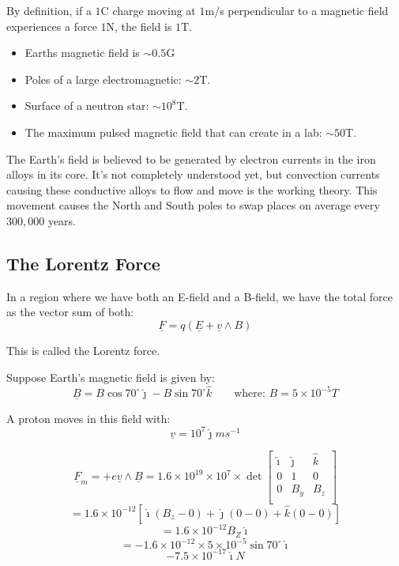 By definition, if a $1$C charge moving at $1$m/s perpendicular to a magnetic field experiences a force $1$N, the field is $1$T.

\begin{itemize}
    \item Earths magnetic field is $\sim 0.5$G
    \item Poles of a large electromagnetic: $\sim 2$T.
    \item Surface of a neutron star: $\sim 10^8$T.
    \item The maximum pulsed magnetic field that can create in a lab: $\sim 50$T.
\end{itemize}

The Earth's field is believed to be generated by electron currents in the iron alloys in its core. It's not completely understood yet, but convection currents causing these conductive alloys to flow and move is the working theory. This movement causes the North and South poles to swap places on average every $300,000$ years.

\subsection{The Lorentz Force}
In a region where we have both an E-field and a B-field, we have the total force as the vector sum of both:
\[
    \underline{F} = q \left(\underline{E} + \underline{v} \wedge B\right)
\]

This is called the Lorentz force.

Suppose Earth's magnetic field is given by:
\[
    \underline{B} = B \cos 70^\circ \hat{\jmath} - B \sin 70^\circ \hat{k} \qquad \text{where: } B = 5 \times 10^{-5} \si{T}
\]

A proton moves in this field with:
\[
    \underline{v} = 10^7 \hat{\jmath} \si{ms^{-1}}
\]

\[
    \underline{F}_m = +e \underline{v} \wedge \underline{B} = 1.6\times 10^{19} \times 10^7 \times \det\begin{bmatrix}
    \hat{\imath} & \hat{\jmath} & \hat{k} \\
    0 & 1 & 0 \\
    0 & B_y & B_z \\
    \end{bmatrix}
\]
\[
    = 1.6 \times 10^{-12} \left[\hat{\imath} \left(B_z - 0\right) + \hat{\jmath} \left(0-0\right) + \hat{k} \left(0-0\right)\right]
\]
\[
    = 1.6 \times 10^{-12} B_Z \hat{\imath}
\]
\[
    = - 1.6 \times 10^{-12} \times 5 \times 10^{-5} \sin 70^\circ \hat{\imath}
\]
\[
    - 7.5 \times 10^{-17} \hat{\imath} \si{N}
\]



